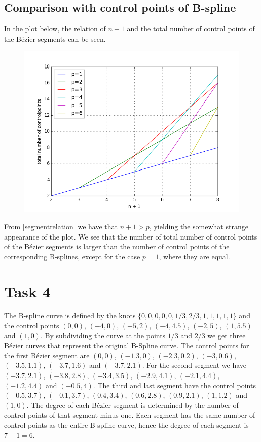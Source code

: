 \documentclass[]{article}
\begin{document}
\subsection*{Comparison with control points of B-spline}
In the plot below, the relation of $n+1$ and the total number of control points of the B\'{e}zier segments can be seen. 
\begin{figure}[h!]
	\includegraphics[scale=0.5]{segmentrelation}
\end{figure}
From \eqref{segmentrelation} we have that $n+1>p$, yielding the somewhat strange appearance of the plot. We see that the number of total number of control points of the B\'{e}zier segments is larger than the number of control points of the corresponding B-splines, except for the case $p=1$, where they are equal.

\section*{Task 4}
The B-spline curve is defined by the knots $\{0,0,0,0,0,1/3,2/3,1,1,1,1,1\}$ and the control points $(0,0)$, $(-4,0)$, $(-5,2)$, $(-4,4.5)$, $(-2,5)$, $(1,5.5)$ and $(1,0)$. By subdividing the curve at the points $1/3$ and $2/3$ we get three B\'{e}zier curves that represent the original B-Spline curve. The control points for the first B\'{e}zier segment are $(0,0)$, $(-1.3,0)$, $(-2.3,0.2)$, $(-3,0.6)$, $(-3.5,1.1)$, $(-3.7,1.6)$ and $(-3.7,2.1)$. For the second segment we have $(-3.7,2.1)$, $(-3.8,2.8)$, $(-3.4,3.5)$, $(-2.9,4.1)$, $(-2.1,4.4)$, $(-1.2,4.4)$ and $(-0.5,4)$. The third and last segment have the control points $(-0.5,3.7)$, $(-0.1,3.7)$, $(0.4,3.4)$, $(0.6,2.8)$, $(0.9,2.1)$, $(1,1.2)$ and $(1,0)$. The degree of each B\'{e}zier segment is determined by the number of control points of that segment minus one. Each segment has the same number of control points as the entire B-spline curve, hence the degree of each segment is $7-1=6$.
\end{document}
